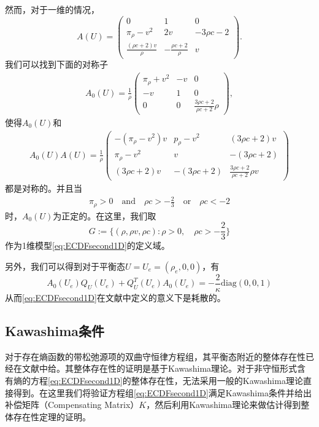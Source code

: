 然而，对于一维的情况，
\begin{equation*}
	A(U) = \left( \begin{array}{ccc}
		0 & 1 & 0 \\
		\pi_\rho - v^2 & 2v & -3 \rho c - 2 \\
		\frac{ (\rho c + 2) v}{\rho} & -  \frac{\rho c + 2}{\rho} & v 
	\end{array}\right).
\end{equation*}
我们可以找到下面的对称子
\begin{eqnarray}\label{31}
A_0(U) = \frac{1}{\rho} \left( \begin{array}{ccc}
	 \pi_\rho  +v^2 & -v & 0 \\ [2mm]
	-v & 1 & 0 \\[2mm]
	0 & 0 & \frac{3\rho c+2}{\rho c+2}\rho  \end{array} \right),
\end{eqnarray}
使得$A_0(U)$和
\begin{eqnarray*}
A_0(U) A(U) = \frac{1}{\rho} \left( \begin{array}{ccc}
		-(\pi_{\rho}-v^2)v & {p_\rho -v^2} & {(3\rho c + 2)v} \\[2mm]
		{\pi_\rho-v^2} & {v} & -{(3 \rho c+2)} \\[2mm]
		{(3 \rho c+ 2)v} & -{(3 \rho c+2)} & \frac{3\rho c+2}{\rho c + 2}\rho v
		\end{array} \right)
\end{eqnarray*}
都是对称的。并且当
\begin{eqnarray*}
\pi_\rho > 0 \quad \mbox{and} \quad \rho c > -\frac{2}{3} \quad \mbox{or} \quad  \rho c < -2 
\end{eqnarray*}
时，$A_0(U)$为正定的。在这里，我们取
\begin{equation}\label{37}
G := \{(\rho,\rho v, \rho c): \rho>0, \quad \rho c> - \frac{2}{3}\}
\end{equation}
作为1维模型\eqref{eq:ECDFsecond1D}的定义域。

另外，我们可以得到对于平衡态$U=U_e = (\rho_e,0,0)$，有
\begin{equation}\label{32}
A_0(U_e)Q_U(U_e) + Q_U^T(U_e)A_0(U_e) =-\frac{2}{\kappa}\mbox{diag}(0, 0, 1)
\end{equation}
从而\eqref{eq:ECDFsecond1D}在文献\cite{yong1992singular,yong1999singular}中定义的意义下是耗散的。

\subsection{Kawashima条件}
对于存在熵函数的带松弛源项的双曲守恒律方程组，其平衡态附近的整体存在性已经在文献\cite{yong2004entropy,hanouzet2003global}中给。其整体存在性的证明是基于Kawashima理论。对于非守恒形式含有熵的方程\eqref{eq:ECDFsecond1D}的整体存在性，无法采用一般的Kawashima理论直接得到。在这里我们将验证方程组\eqref{eq:ECDFsecond1D}满足Kawashima条件并给出补偿矩阵（Compensating Matrix）$K$\cite{kawashima1985systems}，然后利用Kawashima理论来做估计得到整体存在性定理的证明。

